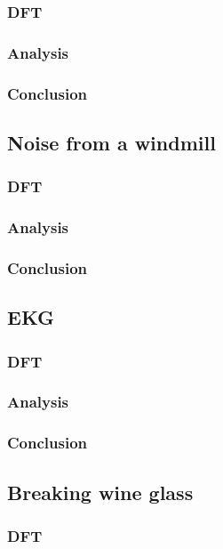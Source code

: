 \subsubsection{DFT}

\subsubsection{Analysis}

\subsubsection{Conclusion}

\subsection{Noise from a windmill}
\subsubsection{DFT}

\subsubsection{Analysis}

\subsubsection{Conclusion}

\subsection{EKG}
\subsubsection{DFT}

\subsubsection{Analysis}

\subsubsection{Conclusion}

\subsection{Breaking wine glass}
\subsubsection{DFT}

